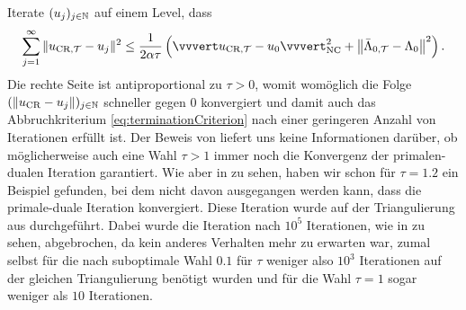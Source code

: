 Iterate $(u_j)_{j\in\mathbb{N}}$ auf einem Level, dass
\begin{align*}
  \sum_{j=1}^\infty\Vert \ucrt - u_j \Vert^2 
  \leq
  \frac{1}{2\alpha\tau}
  \left(\vvvert \ucrt - u_0\vvvert^2_\nc 
  + \left\Vert \bar\Lambda_{0,\Tcal} - \Lambda_0\right\Vert^2\right). 
\end{align*}
Die rechte Seite ist antiproportional zu $\tau>0$, womit womöglich
die Folge $(\left\Vert u_\textup{CR} - u_j\right\Vert)_{j\in\mathbb{N}}$ schneller gegen $0$
konvergiert und damit auch das Abbruchkriterium \eqref{eq:terminationCriterion}
nach einer geringeren Anzahl von Iterationen erfüllt ist. 
Der Beweis von  liefert uns keine
Informationen darüber, ob möglicherweise auch eine Wahl $\tau>1$ immer noch die
Konvergenz der primalen-dualen Iteration garantiert.
Wie aber in  zu sehen, haben wir schon für
$\tau=1.2$ ein Beispiel gefunden, bei dem nicht davon ausgegangen werden kann,
dass die primale-duale Iteration konvergiert.
Diese Iteration wurde auf der Triangulierung aus  
durchgeführt. 
Dabei wurde die Iteration nach $10^5$ Iterationen, wie in
 zu sehen, abgebrochen, da kein anderes
Verhalten mehr zu erwarten war, zumal selbst für die nach
 suboptimale Wahl $0.1$ für $\tau$ weniger also $10^3$
Iterationen auf der gleichen Triangulierung benötigt wurden und für die Wahl
$\tau=1$ sogar weniger als $10$ Iterationen.

